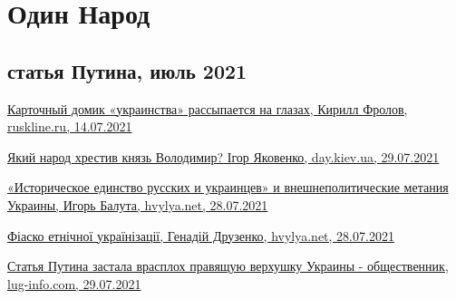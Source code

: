  
 
 
 
 
\chapter{Один Народ}
\label{sec:topics.odin_narod}

\section{статья Путина, июль 2021}






\href{https://ruskline.ru/news_rl/2021/07/14/kartochnyi_domik_ukrainstva_rassypaetsya_na_glazah}{%
Карточный домик «украинства» рассыпается на глазах, Кирилл Фролов, ruskline.ru, 14.07.2021%
}

\href{https://day.kyiv.ua/uk/blog/suspilstvo/yakyy-narod-hrestyv-knyaz-volodymyr}{%
Який народ хрестив князь Володимир? Ігор Яковенко, day.kiev.ua, 29.07.2021%
}

\href{https://analytics.hvylya.net/234637-istoricheskoe-edinstvo-russkih-i-ukraincev-i-vneshnepoliticheskie-metaniya-ukrainy}{%
«Историческое единство русских и украинцев» и внешнеполитические метания Украины, Игорь Балута, hvylya.net, 28.07.2021%
}

\href{https://analytics.hvylya.net/234631-fiasko-etnichnoji-ukrajinizaciji}{%
Фіаско етнічної українізації, Генадій Друзенко, hvylya.net, 28.07.2021%
}

\href{https://lug-info.com/news/stat-a-putina-zastala-vrasploh-pravasuu-verhusku-ukrainy-obsestvennik}{%
Статья Путина застала врасплох правящую верхушку Украины - общественник, lug-info.com, 29.07.2021%
}

